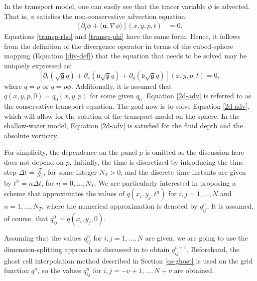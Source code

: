 \documentclass[preprint,12pt]{elsarticle}
\begin{document}
\begin{linenumbers}
In the transport model, one can easily see that the tracer variable $\phi$ is advected.
That is, $\phi$ satisfies the non-conservative advection equation:
\begin{align}
	\label{adv-phi}
	[\partial_t \phi +  
	\langle\boldsymbol{u}, \nabla \phi \rangle](x,y,p,t)&=0.
\end{align}
Equations \eqref{transp-rho} and \eqref{transp-phi} have the same form. 
Hence, it follows from the definition of the divergence operator in terms of the cubed-sphere mapping (Equation \eqref{div-def}) that the equation that needs to be solved may be uniquely expressed as:
\begin{equation}
	\label{2d-adv}
	[{\partial_t (\sqrt{\mathfrak{g}}q)}+
	{\partial_x (\mathfrak{u}\sqrt{\mathfrak{g}}q)}+
	{\partial_y (\mathfrak{v}\sqrt{\mathfrak{g}}q)}]
	(x, y, p, t) = 0,
\end{equation}
where $q=\rho$ or $q=\rho \phi$. 
Additionally, it is assumed that $q(x,y,p,0)=q_0(x,y,p)$ for some given $q_0$.
Equation \eqref{2d-adv} is referred to as the conservative transport equation.
The goal now is to solve Equation \eqref{2d-adv}, which will allow for the solution of the transport model on the sphere.
In the shallow-water model, Equation \eqref{2d-adv} is satisfied for the fluid depth and the absolute vorticity.

For simplicity, the dependence on the panel $p$ is omitted as the discussion here does not depend on $p$.
Initially, the time is discretized by introducing the time step $\Delta t = \frac{T}{N_T}$, for some integer $N_T > 0$, and  the discrete time instants are given by $t^n = n\Delta t$,
for $n=0,\ldots,N_T$. 
We are particularly interested in proposing a scheme that approximates the values of $q(x_i,y_j,t^n)$ for $i,j=1,\ldots,N$ and $n=1,\ldots,N_T$, where the numerical approximation is denoted  by $q_{ij}^n$.
It is assumed, of course, that $q_{ij}^0 = q(x_i,y_j,0)$.

Assuming that the values $q_{ij}^n$ for $i,j=1, \ldots, N$ are given, we are going to use the dimension-splitting approach as discussed in \cite{lin:1996} to obtain $q_{ij}^{n+1}$. 
Beforehand, the ghost cell interpolation method described in Section \ref{cs-ghost} is used on the grid function $q^n$, so  the values $q_{ij}^n$ for $i,j=-\nu+1, \ldots, N+\nu$ are obtained.


\end{linenumbers}
\end{document}
